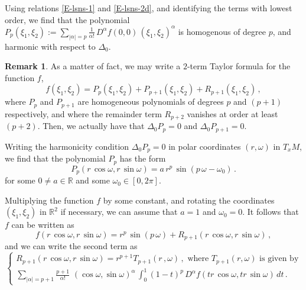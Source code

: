 \documentclass[12pt,a4paper]{amsart}
\theoremstyle{plain} %
\theoremstyle{definition}
\newtheorem{remark}[theorem]{Remark}
\numberwithin{equation}{section}
\numberwithin{figure}{section}
\numberwithin{table}{section}
\newcommand{\R}{\mathbb{R}}
\begin{document}
Using relations \eqref{E-lsns-1} and \eqref{E-lsns-2d}, and identifying the terms with lowest order, we find that the polynomial $P_p(\xi_1,\xi_2) := \sum_{|\alpha| = p} \frac{1}{\alpha!}\, D^{\alpha}\!f(0,0)\,(\xi_1,\xi_2)^{\alpha}$ is homogenous of degree $p$, and harmonic with respect to $\Delta_0$.


\begin{remark}\label{R-lsns-2}
As a matter of fact, we may write a $2$-term Taylor formula for the function $f$,
\begin{equation*}
f(\xi_1,\xi_2) = P_p(\xi_1,\xi_2) + P_{p+1}(\xi_1,\xi_2) + R_{p+1}(\xi_1,\xi_2)\,,
\end{equation*}
where $P_p$ and $P_{p+1}$ are homogeneous polynomials of degrees $p$ and $(p+1)$ respectively, and where the remainder term $R_{p+2}$ vanishes at order at least $(p+2)$. Then, we actually have that $\Delta_0 P_p = 0$ and $\Delta_0 P_{p+1} = 0$.
\end{remark}%

Writing the harmonicity condition $\Delta_0 P_p = 0$ in polar coordinates $(r,\omega)$ in $T_xM$, we find that the polynomial $P_p$ has the form
%
\begin{equation}\label{E-lsns-4b}
P_p(r\, \cos \omega, r\, \sin \omega) = a \, r^p \, \sin(p\,\omega - \omega_0)\,.
\end{equation}
%
for some $0 \not = a \in \R$ and some $\omega_0 \in [0,2\pi]$.\medskip

Multiplying the function $f$ by some constant, and rotating the coordinates $(\xi_1,\xi_2)$ in $\R^2$ if necessary, we can assume that $a=1$ and $\omega_0 = 0$. It follows that $f$ can be written as
%
\begin{equation}\label{E-lsns-6}
f(r\, \cos \omega, r\, \sin \omega) = r^p \, \sin(p\,\omega) + R_{p+1}(r\, \cos\omega, r\, \sin\omega)\,,
\end{equation}
%
and we can write the second term as
%
\begin{equation}\label{E-lsns-8}
\left\{
\begin{array}{l}
R_{p+1}(r\, \cos\omega, r\, \sin\omega) = r^{p+1}T_{p+1}(r\,, \omega)\,, \text{~where~} T_{p+1}(r,\omega) \text{~is given by}\\[5pt]
\sum_{|\alpha| = p+1} \frac{p+1}{\alpha!}\, \,(\cos \omega,\sin \omega)^{\alpha} \, {\displaystyle \int_0^1 (1-t)^p\, D^{\alpha}\!f(tr\,\cos\omega,tr\,\sin\omega)\,dt}\,.
\end{array}%
\right.
\end{equation}
\end{document}
